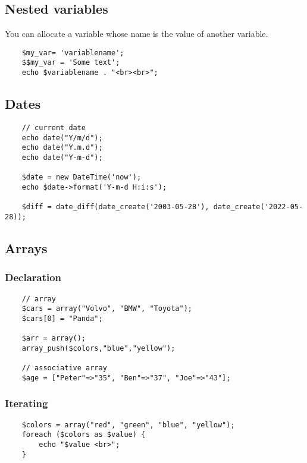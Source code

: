 \documentclass{article}
\begin{document}
\subsection{Nested variables}

You can allocate a variable whose name is the value of another variable.

\begin{lstlisting}
    $my_var= 'variablename';
    $$my_var = 'Some text';
    echo $variablename . "<br><br>";
\end{lstlisting}

\subsection{Dates}

\begin{lstlisting}
    // current date
    echo date("Y/m/d");
    echo date("Y.m.d");
    echo date("Y-m-d");

    $date = new DateTime('now');
    echo $date->format('Y-m-d H:i:s');

    $diff = date_diff(date_create('2003-05-28'), date_create('2022-05-28));
\end{lstlisting}

\subsection{Arrays}

\subsubsection{Declaration}

\begin{lstlisting}
    // array
    $cars = array("Volvo", "BMW", "Toyota");
    $cars[0] = "Panda";

    $arr = array();
    array_push($colors,"blue","yellow");
    
    // associative array
    $age = ["Peter"=>"35", "Ben"=>"37", "Joe"=>"43"];
\end{lstlisting}

\subsubsection{Iterating}

\begin{lstlisting}
    $colors = array("red", "green", "blue", "yellow");
    foreach ($colors as $value) {
        echo "$value <br>";
    }
\end{lstlisting}
\end{document}
